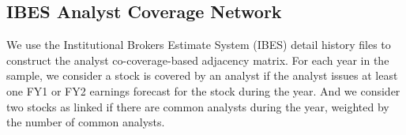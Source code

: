 \subsection{IBES Analyst Coverage Network}
We use the Institutional Brokers Estimate System (IBES) detail history files to construct the analyst co-coverage-based adjacency matrix. For each year in the sample, we consider a stock is covered by an analyst if the analyst issues at least one FY1 or FY2 earnings forecast for the stock during the year. And we consider two stocks as linked if there are common analysts during the year, weighted by the number of common analysts. 
